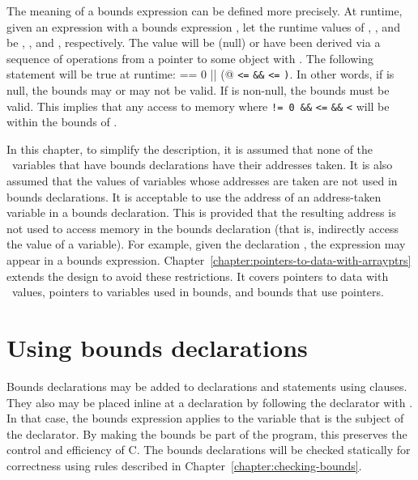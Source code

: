 The meaning of a bounds expression can be defined more precisely. At
runtime, given an expression  with a bounds expression
, let the runtime
values of , , and  be , ,
and , respectively. The value  will be  (null) or
have been derived via a sequence of operations from a pointer to some
object  with .
The following statement will be true at runtime:
 \lstinline@== 0 || (@ \lstinline|<=|  \lstinline|&&|
 \lstinline|<=| \lstinline|)|. In other words, 
if  is null, the bounds
may or may not be valid. If  is non-null, the bounds must be
valid. This implies that any access to memory where 
\lstinline|!= 0 &&|  \lstinline|<=|  \lstinline|&&| 
\lstinline|<|  will be within the bounds of .

In this chapter, to simplify the description, it is assumed that none of
the \arrayptr\ variables that have bounds declarations have
their addresses taken. It is also assumed that the values of variables
whose addresses are taken are not used in bounds declarations. It is
acceptable to use the address of an address-taken variable in a bounds
declaration. This is provided that the resulting address is not used to
access memory in the bounds declaration (that is, indirectly access the
value of a variable). For example, given the declaration ,
the expression  may appear in a bounds expression.  
Chapter~\ref{chapter:pointers-to-data-with-arrayptrs} extends the
design to avoid these restrictions.  It covers pointers to data with 
\arrayptr\ values,  pointers to variables used in bounds, and bounds 
that use pointers.

\section{Using bounds declarations}

Bounds declarations may be added to declarations and statements using
 clauses. They also may be placed inline at a declaration
by following the declarator with \code{:} . In that
case, the bounds expression applies to the variable that is the subject
of the declarator. By making the bounds be part of the program, this
preserves the control and efficiency of C. The bounds declarations will
be checked statically for correctness using rules described in 
Chapter~\ref{chapter:checking-bounds}.

